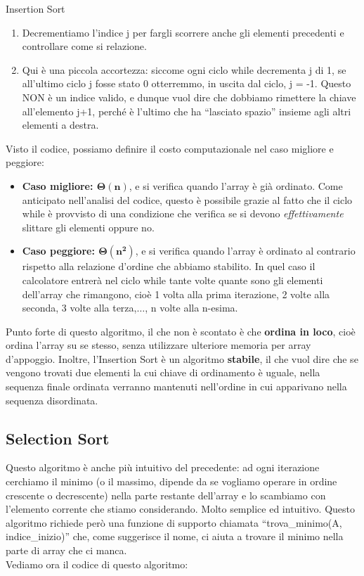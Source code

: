 \documentclass[12pt]{report}
\begin{document}
\begin{algoritmo}{Insertion Sort}{}
\begin{enumerate}
    		\item Decrementiamo l'indice j per fargli scorrere anche gli elementi precedenti e controllare come si relazione.
    				
    		\item Qui è una piccola accortezza: siccome ogni ciclo while decrementa j di 1, se all’ultimo ciclo j fosse stato 0 otterremmo, in uscita dal ciclo, j = -1. Questo NON è un indice valido, e dunque vuol dire che dobbiamo rimettere la chiave all’elemento j+1, perché è l’ultimo che ha “lasciato spazio” insieme agli altri elementi a destra.
    				
    	\end{enumerate}
    \end{algoritmo}
    
    Visto il codice, possiamo definire il costo computazionale nel caso migliore e peggiore:
    \begin{itemize}
    				
    	\item \textbf{Caso migliore: $\mathbf{\Theta(n)}$}, e si verifica quando l’array è già ordinato. Come anticipato nell’analisi del codice, questo è possibile grazie al fatto che il ciclo while è provvisto di una condizione che verifica se si devono \textit{effettivamente} slittare gli elementi oppure no.
    				
    	\item \textbf{Caso peggiore: $\mathbf{\Theta(n^2)}$}, e si verifica quando l’array è ordinato al contrario rispetto alla relazione d’ordine che abbiamo stabilito. In quel caso il calcolatore entrerà nel ciclo while tante volte quante sono gli elementi dell’array che rimangono, cioè 1 volta alla prima iterazione, 2 volte alla seconda, 3 volte alla terza,$\dots$, n volte alla n-esima.
    				
    \end{itemize}
    			
    Punto forte di questo algoritmo, il che non è scontato è che \textbf{ordina in loco}, cioè ordina l’array su se stesso, senza utilizzare ulteriore memoria per array d’appoggio.
	Inoltre, l’Insertion Sort è un algoritmo \textbf{stabile}, il che vuol dire che se vengono trovati due elementi la cui chiave di ordinamento è uguale, nella sequenza finale ordinata verranno mantenuti nell'ordine in cui apparivano nella sequenza disordinata.
    	
    \subsection{Selection Sort}
    Questo algoritmo è anche più intuitivo del precedente: ad ogni iterazione cerchiamo il minimo (o il massimo, dipende da se vogliamo operare in ordine crescente o decrescente) nella parte restante dell’array e lo scambiamo con l’elemento corrente che stiamo considerando. Molto semplice ed intuitivo. Questo algoritmo richiede però una funzione di supporto chiamata “trova\_minimo(A, indice\_inizio)” che, come suggerisce il nome, ci aiuta a trovare il minimo nella parte di array che ci manca.\\
    Vediamo ora il codice di questo algoritmo:
    		
\end{document}
